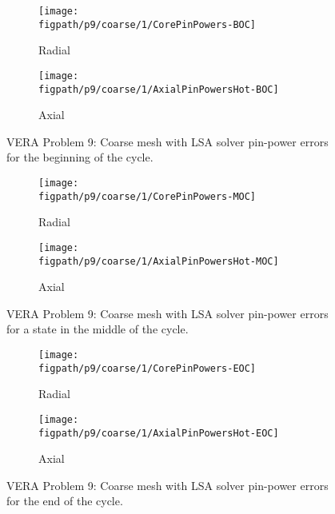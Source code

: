 {{{      \begin{figure}[htbp]
        \centering
        \begin{subfigure}[t]{0.425\textwidth}
          \centering
          \texttt{[image: \\figpath/p9/coarse/1/CorePinPowers-BOC]}
          \caption{Radial\label{fig:LSMOC:P9:Coarse-LS:CorePinPowers:BOC}}
        \end{subfigure}%
        \begin{subfigure}[t]{0.425\textwidth}
          \centering
            \texttt{[image: \\figpath/p9/coarse/1/AxialPinPowersHot-BOC]}
            \caption{Axial\label{fig:LSMOC:P9:Coarse-LS:AxialPinPowers:BOC}}
        \end{subfigure}
        \caption{VERA Problem 9: Coarse mesh with LSA solver pin-power errors for the beginning of the cycle.\label{figs:LSMOC:P9:Coarse-LS:PinPowers:BOC}}
        \begin{subfigure}[t]{0.425\textwidth}
          \centering
          \texttt{[image: \\figpath/p9/coarse/1/CorePinPowers-MOC]}
          \caption{Radial\label{fig:LSMOC:P9:Coarse-LS:CorePinPowers:MOC}}
        \end{subfigure}%
        \begin{subfigure}[t]{0.425\textwidth}
          \centering
            \texttt{[image: \\figpath/p9/coarse/1/AxialPinPowersHot-MOC]}
            \caption{Axial\label{fig:LSMOC:P9:Coarse-LS:AxialPinPowers:MOC}}
        \end{subfigure}
        \caption{VERA Problem 9: Coarse mesh with LSA solver pin-power errors for a state in the middle of the cycle.\label{figs:LSMOC:P9:Coarse-LS:PinPowers:MOC}}
        \begin{subfigure}[t]{0.425\textwidth}
          \centering
          \texttt{[image: \\figpath/p9/coarse/1/CorePinPowers-EOC]}
          \caption{Radial\label{fig:LSMOC:P9:Coarse-LS:CorePinPowers:EOC}}
        \end{subfigure}%
        \begin{subfigure}[t]{0.425\textwidth}
          \centering
            \texttt{[image: \\figpath/p9/coarse/1/AxialPinPowersHot-EOC]}
            \caption{Axial\label{fig:LSMOC:P9:Coarse-LS:AxialPinPowers:EOC}}
        \end{subfigure}
        \caption{VERA Problem 9: Coarse mesh with LSA solver pin-power errors for the end of the cycle.\label{figs:LSMOC:P9:Coarse-LS:PinPowers:EOC}}
      \end{figure}

}}}
